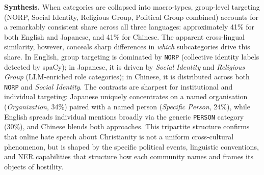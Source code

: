 \documentclass[../CLthesis.tex]{subfiles}
\begin{document}
\textbf{Synthesis.}
When categories are collapsed into macro-types, group-level targeting (NORP, Social Identity, Religious Group, Political Group combined) accounts for a remarkably consistent share across all three languages: approximately 41\% for both English and Japanese, and 41\% for Chinese. The apparent cross-lingual similarity, however, conceals sharp differences in \textit{which} subcategories drive this share. In English, group targeting is dominated by \texttt{NORP} (collective identity labels detected by spaCy); in Japanese, it is driven by \textit{Social Identity} and \textit{Religious Group} (LLM-enriched role categories); in Chinese, it is distributed across both \texttt{NORP} and \textit{Social Identity}. The contrasts are sharpest for institutional and individual targeting: Japanese uniquely concentrates on a named organisation (\textit{Organization}, 34\%) paired with a named person (\textit{Specific Person}, 24\%), while English spreads individual mentions broadly via the generic \texttt{PERSON} category (30\%), and Chinese blends both approaches. This tripartite structure confirms that online hate speech about Christianity is not a uniform cross-cultural phenomenon, but is shaped by the specific political events, linguistic conventions, and NER capabilities that structure how each community names and frames its objects of hostility.


\subfilebibliography
\end{document}
